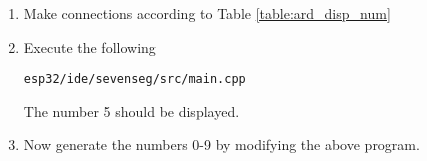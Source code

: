 \begin{enumerate}[label=\arabic*.,ref=\theenumi]
\item
Make connections according to Table \ref{table:ard_disp_num}
\begin{table}[H]
\centering

\caption{}
\label{table:ard_disp_num}
\end{table}

\item
Execute the following
%
\begin{lstlisting}
esp32/ide/sevenseg/src/main.cpp
\end{lstlisting}
%
The number 5 should be displayed.
\item
Now generate the numbers 0-9 by modifying the above program.

\end{enumerate}
